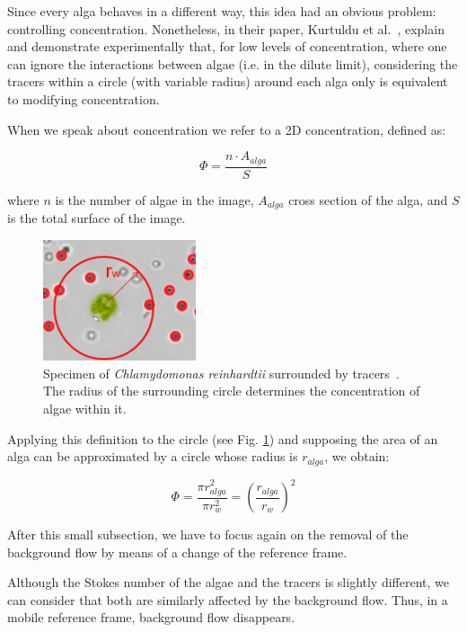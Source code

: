 Since every alga behaves in a different way, this idea had an obvious problem: controlling concentration. Nonetheless, in their paper, Kurtuldu et al.~\cite{Kurtuldu2011}, explain and demonstrate experimentally that, for low levels of concentration, where one can ignore the interactions between algae (i.e. in the dilute limit), considering the tracers within a circle (with variable radius) around each alga only is equivalent to modifying concentration.  

When we speak about concentration we refer to a 2D concentration, defined as:

\begin{equation}
\Phi = \frac{n \cdot A_{alga}}{S}
\label{concentration}
\end{equation}

where $n$ is the number of algae in the image, $A_{alga}$ cross section of the alga, and $S$ is the total surface of the image.

\begin{figure}[H]
	\centering
	\includegraphics[width=0.4\textwidth]{archivos/concentration_circle.png}
	\caption{Specimen of \textit{Chlamydomonas reinhardtii} surrounded by tracers~\cite{chlamy_circ}. The radius of the surrounding circle determines the concentration of algae within it.}
	\label{concentration_circle}
\end{figure}

Applying this definition to the circle (see Fig. \ref{concentration_circle}) and supposing the area of an alga can be approximated by a circle whose radius is $r_{alga}$, we obtain:

\begin{equation}
\Phi = \frac{\pi r_{alga}^2}{\pi r_w^2} = \left(\frac{r_{alga}}{r_w}\right)^2
\label{conc_circle}
\end{equation}

After this small subsection, we have to focus again on the removal of the background flow by means of a change of the reference frame.

Although the Stokes number of the algae and the tracers is slightly different, we can consider that both are similarly affected by the background flow. Thus, in a mobile reference frame, background flow disappears.

